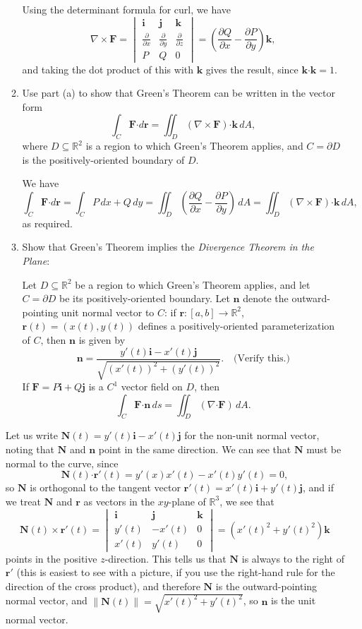 \documentclass[letterpaper,12pt]{article}
\newcommand{\R}{\mathbb{R}}
\newcommand{\F}{\mathbf{F}}
\newcommand{\dotp}{\boldsymbol{\cdot}}
\renewcommand{\r}{\mathbf{r}}
\newcommand{\n}{\mathbf{n}}
\renewcommand{\i}{\mathbf{i}}
\renewcommand{\j}{\mathbf{j}}
\renewcommand{\k}{\mathbf{k}}
\newcommand{\N}{\mathbf{N}}
\newcommand{\len}[1]{\lVert #1\rVert}
\begin{document}
\begin{enumerate}
\begin{enumerate}
Using the determinant formula for curl, we have 
\[
 \nabla\times \F = \begin{vmatrix}\i&\j&\k\\ \frac{\partial}{\partial x} & \frac{\partial}{\partial y} & \frac{\partial}{\partial z}\\ P & Q & 0\end{vmatrix} = \left(\dfrac{\partial Q}{\partial x}-\dfrac{\partial P}{\partial y}\right)\k,
\]
and taking the dot product of this with $\k$ gives the result, since $\k\dotp \k = 1$.

 \item Use part (a) to show that Green's Theorem can be written in the vector form
\[
 \int_{C} \F\dotp d\r = \iint_D (\nabla\times \F)\dotp \k\,dA,
\]
where $D\subseteq \R^2$ is a region to which Green's Theorem applies, and $C=\partial D$ is the positively-oriented boundary of $D$.

\bigskip

We have
\[
 \int_C\F\dotp d\r = \int_C P\,dx+Q\,dy = \iint_D \left(\dfrac{\partial Q}{\partial x}-\dfrac{\partial P}{\partial y}\right)\,dA = \iint_D (\nabla\times \F)\dotp \k\,dA,
\]
as required.

 \item Show that Green's Theorem implies the \textit{Divergence Theorem in the Plane}: 

Let $D\subseteq \R^2$ be a region to which Green's Theorem applies, and let $C=\partial D$ be its positively-oriented boundary. Let $\n$ denote the outward-pointing unit normal vector to $C$: if $\r:[a,b]\to \R^2$, $\r(t)=(x(t),y(t))$ defines a positively-oriented parameterization of $C$, then $\n$ is given by
\[
 \n = \frac{y'(t)\i-x'(t)\j}{\sqrt{(x'(t))^2+(y'(t))^2}}. \quad \text{(Verify this.)}
\]
If $\F=P\i+Q\j$ is a $C^1$ vector field on $D$, then
\[
 \int_C \F\dotp \n\,ds = \iint_D (\nabla \dotp \F)\,dA.
\]
\end{enumerate}


\bigskip

Let us write $\N(t) = y'(t)\i-x'(t)\j$ for the non-unit normal vector, noting that $\N$ and $\n$ point in the same direction. We can see that $\N$ must be normal to the curve, since 
\[
 \N(t)\dotp \r'(t) = y'(x)x'(t)-x'(t)y'(t) = 0,
\]
so $\N$ is orthogonal to the tangent vector $\r'(t) = x'(t)\i+y'(t)\j$, and if we treat $\N$ and $\r$ as vectors in the $xy$-plane of $\R^3$, we see that
\[
 \N(t)\times \r'(t) = \begin{vmatrix}\i&\j&\k\\ y'(t) & -x'(t) & 0\\x'(t) & y'(t) & 0\end{vmatrix} = (x'(t)^2+y'(t)^2)\k
\]
points in the positive $z$-direction. This tells us that $\N$ is always to the right of $\r'$ (this is easiest to see with a picture, if you use the right-hand rule for the direction of the cross product), and therefore $\N$ is the outward-pointing normal vector, and $\len{\N(t)} = \sqrt{x'(t)^2+y'(t)^2}$, so $\n$ is the unit normal vector.


\end{enumerate}
\end{document}
